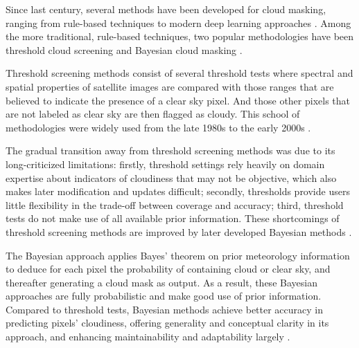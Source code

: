 \documentclass[sigplan,screen]{acmart}
\begin{document}
Since last century, several methods have been developed for cloud masking, ranging from rule-based techniques \cite{Saunders1986AnAS,Saunders1988AnIM,Merchant2005ProbabilisticPB, Zhu2012ObjectbasedCA} to modern deep learning approaches \cite{Li2019DeepLB,Domnich2021KappaMaskAC,Yan2018CloudAC,WIELAND2019111203,JEPPESEN2019247}. Among the more traditional, rule-based techniques, two popular methodologies have been threshold cloud screening \cite{Saunders1986AnAS,Saunders1988AnIM} and Bayesian cloud masking \cite{Merchant2005ProbabilisticPB}. 

Threshold screening methods consist of several threshold tests where spectral and spatial properties of satellite images are compared with those ranges that are believed to indicate the presence of a clear sky pixel. And those other pixels that are not labeled as clear sky are then flagged as cloudy. This school of methodologies were widely used from the late 1980s to the early 2000s \cite{Merchant2005ProbabilisticPB}. 

The gradual transition away from threshold screening methods was due to its long-criticized limitations: firstly, threshold settings rely heavily on domain expertise about indicators of cloudiness that may not be objective, which also makes later modification and updates difficult; secondly, thresholds provide users little flexibility in the trade-off between coverage and accuracy; third, threshold tests do not make use of all available prior information. These shortcomings of threshold screening methods are improved by later developed Bayesian methods \cite{Merchant2005ProbabilisticPB}.

The Bayesian approach applies Bayes' theorem on prior meteorology information to deduce for each pixel the probability of containing cloud or clear sky, and thereafter generating a cloud mask as output. As a result, these Bayesian approaches are fully probabilistic and make good use of prior information. Compared to threshold tests, Bayesian methods achieve better accuracy in predicting pixels' cloudiness, offering generality and conceptual clarity in its approach, and enhancing maintainability and adaptability largely \cite{Merchant2005ProbabilisticPB}. 
\end{document}
